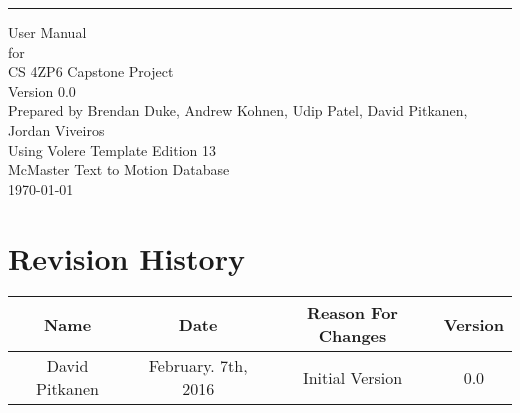 \documentclass{scrreprt}
\date{}
\def\myversion{0.0 }
\begin{document}
\begin{flushright}
    \rule{16cm}{5pt}\vskip1cm
    \begin{bfseries}
        \Huge{User Manual }\\
        \vspace{1.4cm}
        for\\
        \vspace{1.4cm}
        CS 4ZP6 Capstone Project\\
        \vspace{1.4cm}
        \LARGE{Version \myversion}\\
        \vspace{1.4cm}
        Prepared by Brendan Duke, Andrew Kohnen, Udip Patel, David Pitkanen, Jordan Viveiros\\
        \vspace{1.4cm}
        Using Volere Template Edition 13\\
        \vspace{1.4cm}
        McMaster Text to Motion Database\\
        \vspace{1.4cm}
        \today\\
    \end{bfseries}
\end{flushright}

\tableofcontents

\chapter*{Revision History}

\begin{center}
    \begin{tabular}{|c|c|c|c|}
        \hline
            Name & Date & Reason For Changes & Version\\
        \hline
	    David Pitkanen & February. 7th, 2016 & Initial Version & 0.0\\
        \hline
    \end{tabular}
\end{center}

\end{document}
